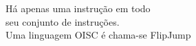 \documentclass[preview]{standalone}
\begin{document}
Há apenas uma instrução em todo\\ seu conjunto de instruções.\\Uma linguagem OISC é chama-se FlipJump\\
\end{document}
